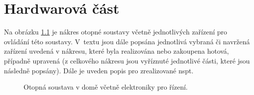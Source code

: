 \chapter{Hardwarová část}

Na obrázku \ref{fig:otopna-soustava-a-elektronika-rez-domu} je nákres otopné soustavy včetně jednotlivých zařízení pro ovládání této soustavy. V~textu jsou dále popsána jednotlivá vybraná či navržená zařízení uvedená v nákresu, které byla realizována nebo zakoupena hotová, případně upravená (z celkového nákresu jsou vyříznuté jednotlivé části, které jsou následně popsány). Dále je uveden popis pro zrealizované \acrshort{nspt}.

\newpage

\begin{figure}[H]
    \centering
    \def\svgwidth{\columnwidth}
    
    \caption{Otopná soustava v domě včetně elektroniky pro řízení.}
    \label{fig:otopna-soustava-a-elektronika-rez-domu}
\end{figure}


























